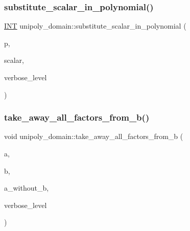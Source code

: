 \mbox{\label{classunipoly__domain_a2f205aa4a289f02b2985261add654099}} 
\subsubsection{\texorpdfstring{substitute\+\_\+scalar\+\_\+in\+\_\+polynomial()}{substitute\_scalar\_in\_polynomial()}}
{\footnotesize\ttfamily \mbox{\hyperlink{galois_8h_a09fddde158a3a20bd2dcadb609de11dc}{I\+NT}} unipoly\+\_\+domain\+::substitute\+\_\+scalar\+\_\+in\+\_\+polynomial (\begin{DoxyParamCaption}\item[{\mbox{\hyperlink{galois_8h_a77ca58de3d2da6172242493dd9c8aaa8}{unipoly\+\_\+object}} \&}]{p,  }\item[{\mbox{\hyperlink{galois_8h_a09fddde158a3a20bd2dcadb609de11dc}{I\+NT}}}]{scalar,  }\item[{\mbox{\hyperlink{galois_8h_a09fddde158a3a20bd2dcadb609de11dc}{I\+NT}}}]{verbose\+\_\+level }\end{DoxyParamCaption})}

\mbox{\label{classunipoly__domain_a65da08a136c47386d06c140157b72809}} 
\subsubsection{\texorpdfstring{take\+\_\+away\+\_\+all\+\_\+factors\+\_\+from\+\_\+b()}{take\_away\_all\_factors\_from\_b()}}
{\footnotesize\ttfamily void unipoly\+\_\+domain\+::take\+\_\+away\+\_\+all\+\_\+factors\+\_\+from\+\_\+b (\begin{DoxyParamCaption}\item[{\mbox{\hyperlink{galois_8h_a77ca58de3d2da6172242493dd9c8aaa8}{unipoly\+\_\+object}}}]{a,  }\item[{\mbox{\hyperlink{galois_8h_a77ca58de3d2da6172242493dd9c8aaa8}{unipoly\+\_\+object}}}]{b,  }\item[{\mbox{\hyperlink{galois_8h_a77ca58de3d2da6172242493dd9c8aaa8}{unipoly\+\_\+object}} \&}]{a\+\_\+without\+\_\+b,  }\item[{\mbox{\hyperlink{galois_8h_a09fddde158a3a20bd2dcadb609de11dc}{I\+NT}}}]{verbose\+\_\+level }\end{DoxyParamCaption})}

